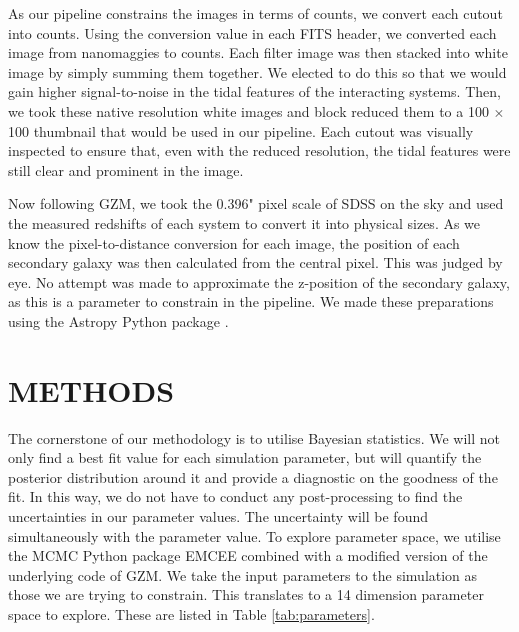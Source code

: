 As our pipeline constrains the images in terms of counts, we convert each cutout into counts. Using the conversion value in each FITS header, we converted each image from nanomaggies to counts. Each filter image was then stacked into white image by simply summing them together. We elected to do this so that we would gain higher signal-to-noise in the tidal features of the interacting systems. Then, we took these native resolution white images and block reduced them to a 100 $\times$ 100 thumbnail that would be used in our pipeline. Each cutout was visually inspected to ensure that, even with the reduced resolution, the tidal features were still clear and prominent in the image.

Now following GZM, we took the 0.396" pixel scale of SDSS on the sky and used the measured redshifts of each system to convert it into physical sizes. As we know the pixel-to-distance conversion for each image, the position of each secondary galaxy was then calculated from the central pixel. This was judged by eye. No attempt was made to approximate the z-position of the secondary galaxy, as this is a parameter to constrain in the pipeline. We made these preparations using the Astropy Python package \citep{astropy:2013, astropy:2018}.

\section{METHODS}\label{Methods}
\noindent The cornerstone of our methodology is to utilise Bayesian statistics. We will not only find a best fit value for each simulation parameter, but will quantify the posterior distribution around it and provide a diagnostic on the goodness of the fit. In this way, we do not have to conduct any post-processing to find the uncertainties in our parameter values. The uncertainty will be found simultaneously with the parameter value. To explore parameter space, we utilise the MCMC Python package EMCEE combined with a modified version of the underlying code of GZM. We take the input parameters to the simulation as those we are trying to constrain. This translates to a 14 dimension parameter space to explore. These are listed in Table \ref{tab:parameters}.

